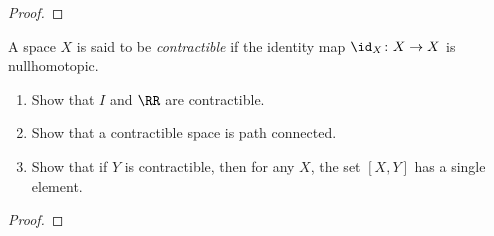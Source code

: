 \begin{proof}
\end{proof}
\newpage
\begin{problem}[Munkres \S51, Ex.\,3(a,b,c,)]
A space $X$ is said to be \emph{contractible} if the identity map
$\id_X\colon X\to X$ is nullhomotopic.
\begin{enumerate}[label=(\alph*)]
\item Show that $I$ and $\RR$ are contractible.
\item Show that a contractible space is path connected.
\item Show that if $Y$ is contractible, then for any $X$, the set
  $[X,Y]$ has a single element.
\end{enumerate}
\end{problem}
\begin{proof}
\end{proof}

